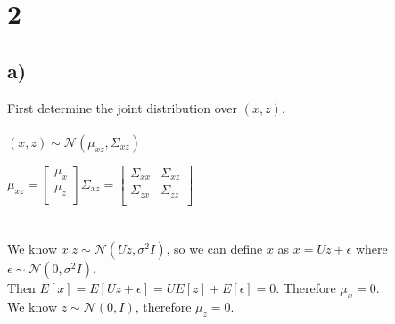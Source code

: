 \documentclass[11pt]{article}
\begin{document}
\section*{2}

\subsection*{a)}

First determine the joint distribution over $(x, z)$.
\\\\
$(x,z) \sim \mathcal{N}(\mu_{xz}, \Sigma_{xz})$

$
\mu_{xz} = 
\begin{bmatrix}
    \mu_x \\
    \mu_z \\
\end{bmatrix}
\Sigma_{xz} = 
\begin{bmatrix}
    \Sigma_{xx} & \Sigma_{xz} \\
    \Sigma_{zx} & \Sigma_{zz} \\
\end{bmatrix}
$
\\\\\\
We know $x|z \sim \mathcal{N}(Uz,\sigma^2 I)$, so we can define $x$ as $x = Uz + \epsilon$ where $\epsilon \sim \mathcal{N}(0, \sigma^2 I)$.\\
Then $E[x] = E[Uz + \epsilon] = UE[z] + E[\epsilon] = 0$. Therefore $\mu_x = 0$. \\

We know $z \sim \mathcal{N}(0,I)$, therefore $\mu_z = 0$. \\
\end{document}
